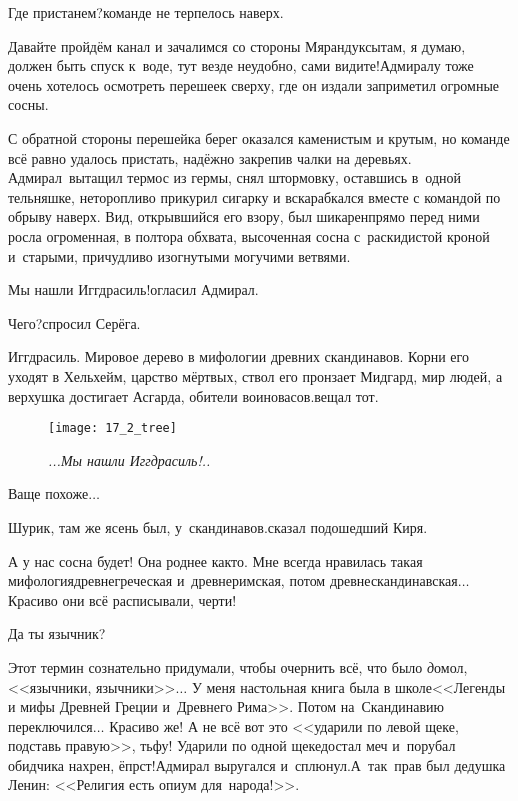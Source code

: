 \diagdash Где пристанем?\mdash команде не терпелось наверх.

\diagdash Давайте пройдём канал и зачалимся со стороны Мярандуксы\mdash там, я думаю, должен быть спуск к~воде, тут везде неудобно, сами видите!\mdash Адмиралу тоже очень хотелось осмотреть перешеек сверху, где он издали заприметил огромные сосны.

С обратной стороны перешейка берег оказался каменистым и крутым, но команде всё равно удалось пристать, надёжно закрепив чалки на деревьях. Адмирал~вытащил термос из гермы, снял штормовку, оставшись в~одной тельняшке, неторопливо прикурил сигарку и вскарабкался вместе с командой по обрыву наверх. Вид, открывшийся его взору, был шикарен\mdash прямо перед ними росла огроменная, в полтора обхвата, высоченная сосна с~раскидистой кроной и~старыми, причудливо изогнутыми могучими ветвями. %

\diagdash Мы нашли Иггдрасиль!\mdash огласил Адмирал.

\diagdash Чего?\mdash спросил Серёга.

\diagdash Иггдрасиль. Мировое дерево в мифологии древних скандинавов. Корни его уходят в Хельхейм, царство мёртвых, ствол его пронзает Мидгард, мир людей, а верхушка достигает Асгарда, обители воинов\sdash асов.\mdash вещал тот. 

\newpage

\begin{wrapfigure}[20]{r}{0.55\textwidth}
\centering
\texttt{[image: 17\_2\_tree]}
\caption{\small\textit{...Мы нашли Иггдрасиль!..}}
\end{wrapfigure}
\diagdash Ваще похоже$\ldots$

\diagdash Шурик, там же ясень был, у~скандинавов.\mdash сказал подошедший Киря.

\diagdash А у нас сосна будет! Она роднее как\sdash то. Мне всегда нравилась такая мифология\mdash древнегреческая и~древнеримская, потом древнескандинавская$\ldots$ Красиво они всё расписывали, черти!

\diagdash Да ты язычник?

\diagdash Этот термин сознательно придумали, чтобы очернить всё, что было {\textit до}\mdash мол, <<язычники, язычники>>$\ldots$ У меня настольная книга была в школе\mdash <<Легенды и мифы Древней Греции и~Древнего Рима>>\cite{Кун}. Потом на~Скандинавию переключился$\ldots$ Красиво же! А не всё вот это <<ударили по левой щеке, подставь правую>>, тьфу! Ударили по одной щеке\mdash достал меч и~порубал обидчика нахрен, ёпрст!\mdash Адмирал выругался и~сплюнул.\mdash А~так~прав был дедушка Ленин: <<Религия есть  опиум для~народа!>>\cite{ЛенинОпиумДляНарода}. 

